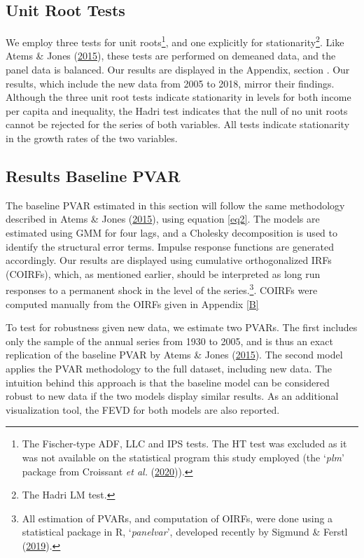 \documentclass[11pt,preprint, authoryear]{elsarticle}
\numberwithin{equation}{section}
\numberwithin{figure}{section}
\numberwithin{table}{section}
\let\rmarkdownfootnote\footnote%
\def\footnote{\protect\rmarkdownfootnote}
\begin{document}
\hypertarget{unit-root-tests}{%
\subsection{\texorpdfstring{Unit Root Tests
\label{Section 3.2}}{Unit Root Tests }}\label{unit-root-tests}}

We employ three tests for unit roots\footnote{The Fischer-type ADF, LLC
  and IPS tests. The HT test was excluded as it was not available on the
  statistical program this study employed (the `\emph{plm}' package from
  Croissant \emph{et al.}
  (\protect\hyperlink{ref-croissant2020package}{2020})).}, and one
explicitly for stationarity\footnote{The Hadri LM test.}. Like Atems \&
Jones (\protect\hyperlink{ref-atems}{2015}), these tests are performed
on demeaned data, and the panel data is balanced. Our results are
displayed in the Appendix, section . Our results, which include
the new data from 2005 to 2018, mirror their findings. Although the
three unit root tests indicate stationarity in levels for both income
per capita and inequality, the Hadri test indicates that the null of no
unit roots cannot be rejected for the series of both variables. All
tests indicate stationarity in the growth rates of the two variables.

\hypertarget{results-baseline-pvar}{%
\subsection{\texorpdfstring{Results Baseline PVAR
\label{Section 3.3}}{Results Baseline PVAR }}\label{results-baseline-pvar}}

The baseline PVAR estimated in this section will follow the same
methodology described in Atems \& Jones
(\protect\hyperlink{ref-atems}{2015}), using equation \ref{eq2}. The
models are estimated using GMM for four lags, and a Cholesky
decomposition is used to identify the structural error terms. Impulse
response functions are generated accordingly. Our results are displayed
using cumulative orthogonalized IRFs (COIRFs), which, as mentioned
earlier, should be interpreted as long run responses to a permanent
shock in the level of the series.\footnote{All estimation of PVARs, and
  computation of OIRFs, were done using a statistical package in R,
  `\emph{panelvar}', developed recently by Sigmund \& Ferstl
  (\protect\hyperlink{ref-sigmund2019panel}{2019}).}. COIRFs were
computed manually from the OIRFs given in Appendix \ref{B}

To test for robustness given new data, we estimate two PVARs. The first
includes only the sample of the annual series from 1930 to 2005, and is
thus an exact replication of the baseline PVAR by Atems \& Jones
(\protect\hyperlink{ref-atems}{2015}). The second model applies the PVAR
methodology to the full dataset, including new data. The intuition
behind this approach is that the baseline model can be considered robust
to new data if the two models display similar results. As an additional
visualization tool, the FEVD for both models are also reported.
\end{document}

